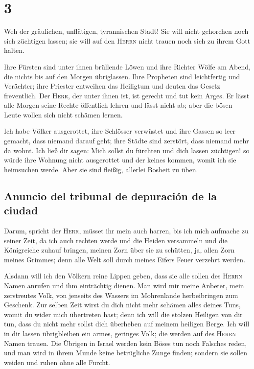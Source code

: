 \hypertarget{section-2}{%
\section{3}\label{section-2}}

 Weh der gräulichen, unflätigen, tyrannischen Stadt!
 Sie will nicht gehorchen noch sich züchtigen lassen; sie
will auf den \textsc{Herrn} nicht trauen noch sich zu ihrem Gott halten.

 Ihre Fürsten sind unter ihnen brüllende Löwen und ihre
Richter Wölfe am Abend, die nichts bis auf den Morgen übriglassen.
 Ihre Propheten sind leichtfertig und Verächter; ihre
Priester entweihen das Heiligtum und deuten das Gesetz freventlich.
 Der \textsc{Herr}, der unter ihnen ist, ist gerecht und
tut kein Arges. Er lässt alle Morgen seine Rechte öffentlich lehren und
lässt nicht ab; aber die bösen Leute wollen sich nicht schämen lernen.

 Ich habe Völker ausgerottet, ihre Schlösser verwüstet und
ihre Gassen so leer gemacht, dass niemand darauf geht; ihre Städte sind
zerstört, dass niemand mehr da wohnt.  Ich ließ dir sagen:
Mich sollst du fürchten und dich lassen züchtigen! so würde ihre Wohnung
nicht ausgerottet und der keines kommen, womit ich sie heimsuchen werde.
Aber sie sind fleißig, allerlei Bosheit zu üben.

\hypertarget{anuncio-del-tribunal-de-depuraciuxf3n-de-la-ciudad}{%
\subsection{Anuncio del tribunal de depuración de la
ciudad}\label{anuncio-del-tribunal-de-depuraciuxf3n-de-la-ciudad}}

 Darum, spricht der \textsc{Herr}, müsset ihr mein auch
harren, bis ich mich aufmache zu seiner Zeit, da ich auch rechten werde
und die Heiden versammeln und die Königreiche zuhauf bringen, meinen
Zorn über sie zu schütten, ja, allen Zorn meines Grimmes; denn alle Welt
soll durch meines Eifers Feuer verzehrt werden.

 Alsdann will ich den Völkern reine Lippen geben, dass sie
alle sollen des \textsc{Herrn} Namen anrufen und ihm einträchtig dienen.
 Man wird mir meine Anbeter, mein zerstreutes Volk, von
jenseits des Wassers im Mohrenlande herbeibringen zum Geschenk.
 Zur selben Zeit wirst du dich nicht mehr schämen alles
deines Tuns, womit du wider mich übertreten hast; denn ich will die
stolzen Heiligen von dir tun, dass du nicht mehr sollst dich überheben
auf meinem heiligen Berge.  Ich will in dir lassen
übrigbleiben ein armes, geringes Volk; die werden auf des \textsc{Herrn}
Namen trauen.  Die Übrigen in Israel werden kein Böses
tun noch Falsches reden, und man wird in ihrem Munde keine betrügliche
Zunge finden; sondern sie sollen weiden und ruhen ohne alle Furcht.

